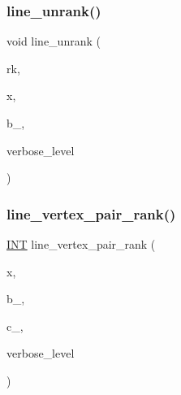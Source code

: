 \subsubsection{\texorpdfstring{line\+\_\+unrank()}{line\_unrank()}}
{\footnotesize\ttfamily void line\+\_\+unrank (\begin{DoxyParamCaption}\item[{\mbox{\hyperlink{galois_8h_a09fddde158a3a20bd2dcadb609de11dc}{I\+NT}}}]{rk,  }\item[{\mbox{\hyperlink{galois_8h_a09fddde158a3a20bd2dcadb609de11dc}{I\+NT}} $\ast$}]{x,  }\item[{\mbox{\hyperlink{galois_8h_a09fddde158a3a20bd2dcadb609de11dc}{I\+NT}} \&}]{b\+\_,  }\item[{\mbox{\hyperlink{galois_8h_a09fddde158a3a20bd2dcadb609de11dc}{I\+NT}}}]{verbose\+\_\+level }\end{DoxyParamCaption})}

\mbox{\label{hamming_8_c_aae5c0d65c1dc0b34d6e79c3c44623e67}} 
\subsubsection{\texorpdfstring{line\+\_\+vertex\+\_\+pair\+\_\+rank()}{line\_vertex\_pair\_rank()}}
{\footnotesize\ttfamily \mbox{\hyperlink{galois_8h_a09fddde158a3a20bd2dcadb609de11dc}{I\+NT}} line\+\_\+vertex\+\_\+pair\+\_\+rank (\begin{DoxyParamCaption}\item[{\mbox{\hyperlink{galois_8h_a09fddde158a3a20bd2dcadb609de11dc}{I\+NT}} $\ast$}]{x,  }\item[{\mbox{\hyperlink{galois_8h_a09fddde158a3a20bd2dcadb609de11dc}{I\+NT}}}]{b\+\_,  }\item[{\mbox{\hyperlink{galois_8h_a09fddde158a3a20bd2dcadb609de11dc}{I\+NT}}}]{c\+\_,  }\item[{\mbox{\hyperlink{galois_8h_a09fddde158a3a20bd2dcadb609de11dc}{I\+NT}}}]{verbose\+\_\+level }\end{DoxyParamCaption})}

\mbox{\label{hamming_8_c_aa61f2206e2b10536583703704f1bf4ea}} 
